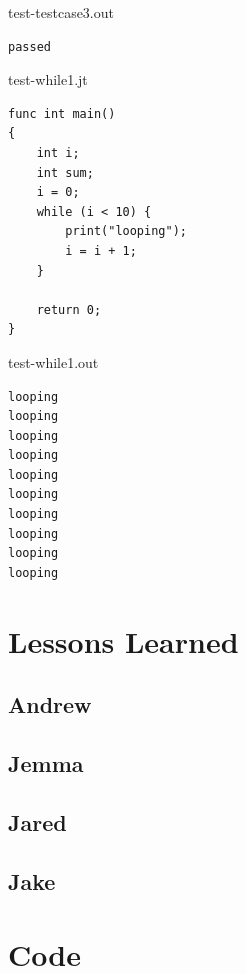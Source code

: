 \documentclass{article}
\begin{document}
test-testcase3.out
\begin{lstlisting}
passed
\end{lstlisting}

\newpage

test-while1.jt
\begin{lstlisting}
func int main()
{
	int i;
	int sum;
	i = 0;
	while (i < 10) {
		print("looping");	
		i = i + 1;
	}

	return 0;
}
\end{lstlisting}

test-while1.out
\begin{lstlisting}
looping
looping
looping
looping
looping
looping
looping
looping
looping
looping
\end{lstlisting}

\newpage

\section{Lessons Learned}
\subsection{Andrew}
\subsection{Jemma}
\subsection{Jared}
\subsection{Jake}

\newpage

\section{Code}
\newpage
\end{document}
